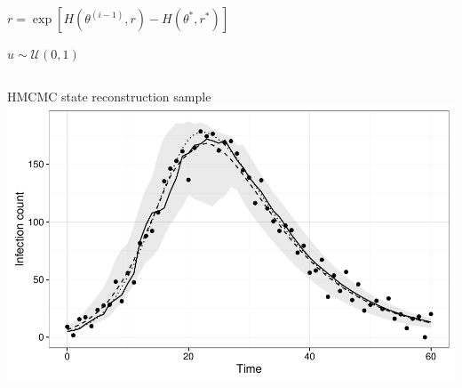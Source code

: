 \documentclass[12pt]{beamer}
\begin{document}
\begin{frame}
\begin{columns}
\begin{column}{0.4\textwidth}
\begin{algorithm}[H]
{		            
		            $r = \exp \left[ H(\theta^{(i-1)},r) - H(\theta^*,r^*) \right]$

		            $u \sim \mathcal{U}(0,1)$

		        }


		    \end{algorithm}

		\end{column}
	\end{columns}

\end{frame}

\begin{frame}

	\null
	\vfill
	HMCMC state reconstruction sample \\
	\vspace{\baselineskip}
	\includegraphics[width=\textwidth,height=\textheight,keepaspectratio=true]{../../writing/SC1/images/hmcboot}
	\vfill

\end{frame}
\end{document}
